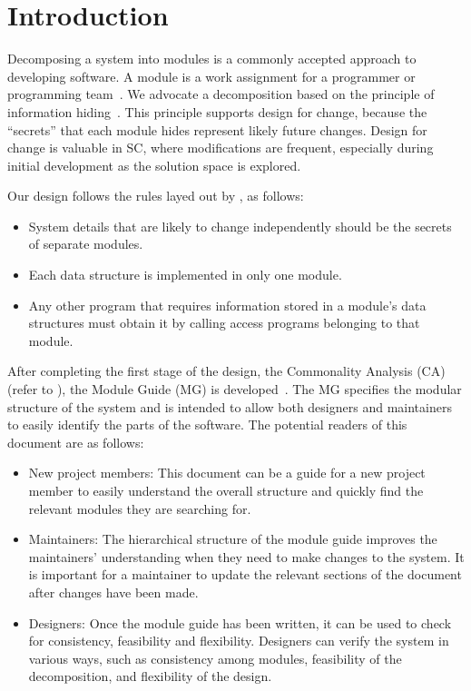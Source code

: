 \documentclass[12pt, titlepage]{article}
\begin{document}
\newpage

\tableofcontents

\listoftables

\listoffigures

\newpage


\section{Introduction}

Decomposing a system into modules is a commonly accepted approach to developing
software.  A module is a work assignment for a programmer or programming
team~\citep{ParnasEtAl1984}.  We advocate a decomposition
based on the principle of information hiding~\citep{Parnas1972a}.  This
principle supports design for change, because the ``secrets'' that each module
hides represent likely future changes.  Design for change is valuable in SC,
where modifications are frequent, especially during initial development as the
solution space is explored.  

Our design follows the rules layed out by \citet{ParnasEtAl1984}, as follows:
\begin{itemize}
\item System details that are likely to change independently should be the
  secrets of separate modules.
\item Each data structure is implemented in only one module.
\item Any other program that requires information stored in a module's data
  structures must obtain it by calling access programs belonging to that module.
\end{itemize}

After completing the first stage of the design, the Commonality Analysis (CA)  (refer to \citet{LBM_CA_PM}), the Module Guide (MG) is developed~\citep{ParnasEtAl1984}. The MG
specifies the modular structure of the system and is intended to allow both
designers and maintainers to easily identify the parts of the software.  The
potential readers of this document are as follows:

\begin{itemize}
\item New project members: This document can be a guide for a new project member
  to easily understand the overall structure and quickly find the
  relevant modules they are searching for.
\item Maintainers: The hierarchical structure of the module guide improves the
  maintainers' understanding when they need to make changes to the system. It is
  important for a maintainer to update the relevant sections of the document
  after changes have been made.
\item Designers: Once the module guide has been written, it can be used to
  check for consistency, feasibility and flexibility. Designers can verify the
  system in various ways, such as consistency among modules, feasibility of the
  decomposition, and flexibility of the design.
\end{itemize}
\end{document}
